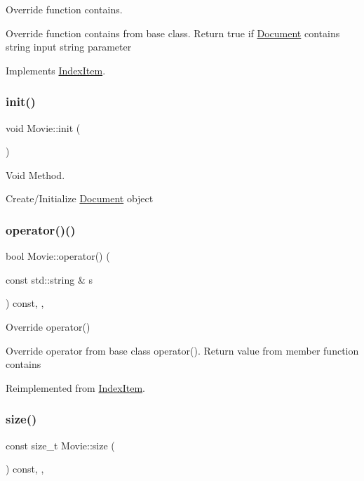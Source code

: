 Override function contains. 

Override function contains from base class. Return true if \hyperlink{class_document}{Document} contains string input string parameter 

Implements \hyperlink{class_index_item_a534d96bf041a485ed124663b9cded2fb}{Index\+Item}.

\mbox{\label{class_movie_a132f64e865e4fb8e03e9e422ef24579d}} 
\subsubsection{\texorpdfstring{init()}{init()}}
{\footnotesize\ttfamily void Movie\+::init (\begin{DoxyParamCaption}{ }\end{DoxyParamCaption})}



Void Method. 

Create/\+Initialize \hyperlink{class_document}{Document} object \mbox{\label{class_movie_a2ccd49265baa8fe6c51f8f4953f20bca}} 
\subsubsection{\texorpdfstring{operator()()}{operator()()}}
{\footnotesize\ttfamily bool Movie\+::operator() (\begin{DoxyParamCaption}\item[{const std\+::string \&}]{s }\end{DoxyParamCaption}) const\hspace{0.3cm}{\ttfamily [inline]}, {\ttfamily [override]}, {\ttfamily [virtual]}}



Override operator() 

Override operator from base class operator(). Return value from member function contains 

Reimplemented from \hyperlink{class_index_item_a38ccc46639b8d0b066024bad728c1bfa}{Index\+Item}.

\mbox{\label{class_movie_ad396ecf97c83fb48c09d2ea6138b430a}} 
\subsubsection{\texorpdfstring{size()}{size()}}
{\footnotesize\ttfamily const size\+\_\+t Movie\+::size (\begin{DoxyParamCaption}{ }\end{DoxyParamCaption}) const\hspace{0.3cm}{\ttfamily [inline]}, {\ttfamily [override]}, {\ttfamily [virtual]}}



